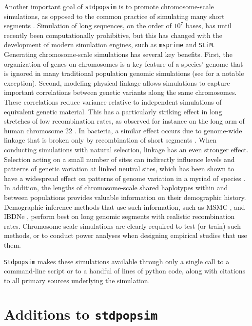 \documentclass[hidelinks]{article}
\newcommand{\Stdpopsim}{\texttt{Stdpopsim}\xspace}
\newcommand{\stdpopsim}{\texttt{stdpopsim}\xspace}
\begin{document}
Another important goal of \stdpopsim is to promote chromosome-scale simulations,
as opposed to the common practice of simulating many short segments \citep[see, e.g.,][]{harris2016genetic}.
Simulation of long sequences, on the order of $10^7$ bases,
has until recently been computationally prohibitive,
but this has changed with the development of modern simulation engines,
such as \texttt{msprime} and \texttt{SLiM}.
Generating chromosome-scale simulations has several key benefits.
First, the organization of genes on chromosomes is a key feature of a species' genome that is ignored in many traditional population genomic simulations
 (see \cite{schrider2020background} for a notable exception).
Second, modeling physical linkage allows simulations to capture
important correlations between genetic variants along the same chromosomes.
These correlations reduce variance relative to independent simulations of equivalent genetic material.
This has a particularly striking effect in long stretches of low recombination rates,
as observed for instance on the long arm of human chromosome 22 \citep{Dawson2002}.
In bacteria, a similar effect occurs due to genome-wide linkage that is broken only
by recombination of short segments \citep{Didelot2010}.
When conducting simulations with natural selection, linkage has
an even stronger effect. Selection acting on a small number of sites can
indirectly influence levels and patterns of genetic variation at linked neutral sites,
which has been shown to have a widespread
effect on patterns of genome variation in a myriad of species
\citep[e.g.,][]{McVicker2009,Charlesworth2012}. 
In addition, the lengths of chromosome-scale shared haplotypes within and
between populations provides valuable information on their demographic history.
Demographic inference methods that use such information,
such as MSMC \citep{Schiffels2020}, and IBDNe \citep{browning2015accurate},
perform best on long genomic segments with realistic recombination rates.
Chromosome-scale simulations are clearly required to test (or train) such methods,
or to conduct power analyses when designing empirical studies that use them.

\Stdpopsim makes these simulations available
through only a single call to a command-line script
or to a handful of lines of python code,
along with citations to all primary sources underlying the simulation.


\section*{Additions to \stdpopsim}
    \label{sec:expanded-catalog}
\end{document}
